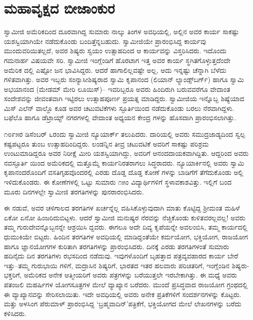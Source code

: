
\chapter{ಮಹಾವೃಕ್ಷದ ಬೀಜಾಂಕುರ}

\noindent

ಸ್ವಾಮೀಜಿ ಅಮೆರಿಕದಿಂದ ದೂರವಾಗಿದ್ದ ಸುಮಾರು ನಾಲ್ಕು ತಿಂಗಳ ಅವಧಿಯಲ್ಲಿ, ಅಲ್ಲಿನ ಅವರ ಕಾರ್ಯ ಸಾಕಷ್ಟು ಯಶಸ್ವಿಯಾಗಿಯೇ ನಡೆದುಕೊಂಡು ಬಂದಿತ್ತೆನ್ನಬಹುದು. ಸ್ವಾಮೀಜಿಯೇ ಪ್ರಾರಂಭಿಸಿದ್ದ ಕಾರ್ಯವು ಮುಂದುವರಿಯಿತಲ್ಲದೆ, ಅವರ ಶಿಷ್ಯರು ಸ್ವಯಂ ಉತ್ಸಾಹದಿಂದ ಆ ಕಾರ್ಯವನ್ನು ವಿಸ್ತರಿಸಿದರು. ಇದೊಂದು ಗಮನಾರ್ಹ ವಿಷಯವೇ ಸರಿ. ಸ್ವಾಮೀಜಿ ಇಂಗ್ಲೆಂಡಿಗೆ ಹೊರಟಾಗ ಇತ್ತ ಅವರ ಕಾರ್ಯ ಸ್ಥಗಿತಗೊಳ್ಳುತ್ತದೆಂದೇ ಅಮೆರಿಕ ದಲ್ಲಿ ಎಷ್ಟೋ ಜನ ಭಾವಿಸಿದ್ದರು. ಆದರೆ ಹಾಗಾಲಿಲ್ಲವಷ್ಟೇ ಅಲ್ಲ, ಅದು ಇನ್ನಷ್ಟು ಚೆನ್ನಾಗಿ ಬೆಳೆದು ಗಳಿತವಾಗಿತ್ತು. ಅವರ ಇಬ್ಬರು ಸಂನ್ಯಾಸೀಶಿಷ್ಯರಾದ ಸ್ವಾಮಿ ಕೃಪಾನಂದ (ಲಿಯಾನ್ ಲ್ಯಾಂಡ್ಸ್​ಬರ್ಗ್​) ಹಾಗೂ ಸ್ವಾಮಿ ಅಭಯಾನಂದ (ಮೇಡಮ್ ಮೇರಿ ಲೂಯಿಸ್​)– ಇವರಿಬ್ಬರೂ ಅವರು ಹಿಂದಿರುಗಿ ಬರುವವರೆಗೂ ವೇದಾಂತ ಸಂದೇಶವನ್ನು ಜೀವಂತವಾಗಿ ಇಟ್ಟಿರಲು ಉತ್ಸಾಹಪೂರ್ಣ ಪ್ರಯತ್ನ ಮಾಡಿದ್ದರು. ಸ್ವಾಮೀಜಿಯ ಇನ್ನೊಬ್ಬ ಶಿಷ್ಯೆಯಾದ ಮಿಸ್ ಎಲೆನ್ ವಾಲ್ಡೊ ಕೂಡ ಅವರ ಚಟುವಟಿಕೆಗಳು ಸ್ಫೂರ್ತಿಯಿಂದ ನಡೆದುಕೊಂಡು ಬರಲು ನೆರವಾಗಿದ್ದಳು. ಬಫೆಲೊ ಹಾಗೂ ಡೆಟ್ರಾಯ್ಟ್ ನಗರಗಳಲ್ಲಿ ವೇದಾಂತ ಅಧ್ಯಯನ ಕೇಂದ್ರ ಗಳನ್ನು ಹೊಸದಾಗಿ ಪ್ರಾರಂಭಿಸಲಾಗಿತ್ತು.

೧೮೯೫ರ ಡಿಸೆಂಬರ್ ೬ರಂದು ಸ್ವಾಮೀಜಿ ನ್ಯೂಯಾರ್ಕ್ ತಲುಪಿದರು. ದಾರಿಯಲ್ಲಿ ಅವರು ಸಮುದ್ರಜಾಡ್ಯದಿಂದ ಸ್ವಲ್ಪ ಕಷ್ಟಪಟ್ಟರೂ ತುಂಬ ಉತ್ಸಾಹದಿಂದಿದ್ದರು. ಲಂಡನ್ನಿನ ತೀವ್ರ ಚಟುವಟಿಕೆ ಅವರಿಗೆ ಸಾಕಷ್ಟು ಪರಿಶ್ರಮ ಉಂಟುಮಾಡಿದ್ದರೂ ಅವರ ನಿರೀಕ್ಷೆ ಮೀರಿ ಯಶಸ್ವಿಯಾಗಿದ್ದು, ಅವರಿಗೆ ಆನಂದದಾಯಕವಾಗಿದ್ದಿತು. ಆದ್ದರಿಂದ ಅವರು ನವಸ್ಫೂರ್ತಿ ಯಿಂದ ಅಮೆರಿಕದಲ್ಲಿ ಮತ್ತೊಮ್ಮೆ ಕಾರ್ಯನಿರತರಾಗಲು ಸಿದ್ಧರಾದರು. ನ್ಯೂಯಾರ್ಕಿನಲ್ಲಿ ಅವರು ಸ್ವಾಮಿ ಕೃಪಾನಂದರೊಂದಿಗೆ ವಸತಿಗೃಹವೊಂದರಲ್ಲಿ ಎರಡು ದೊಡ್ಡ ದೊಡ್ಡ ಕೋಣೆ ಗಳನ್ನು ಬಾಡಿಗೆಗೆ ತೆಗೆದುಕೊಂಡು ಅಲ್ಲಿ ಇಳಿದುಕೊಂಡರು. ಈ ಕೋಣೆಗಳಲ್ಲಿ ಒಟ್ಟು ಸುಮಾರು ೧೫ಂ ವಿದ್ಯಾರ್ಥಿಗಳಿಗೆ ಸ್ಥಳಾವಕಾಶವಿತ್ತು. ಇಲ್ಲಿಗೆ ಬಂದ ಮೂರು ದಿನಗಳಲ್ಲೇ ಸ್ವಾಮೀಜಿ ತರಗತಿಗಳನ್ನು ಪುನರಾರಂಭಿಸಿದರು.

ಈ ನಡುವೆ, ಅವರ ಚಳಿಗಾಲದ ತರಗತಿಗಳ ಖರ್ಚನ್ನೆಲ್ಲ ವಹಿಸಿಕೊಳ್ಳುವುದಾಗಿ ಮಾತು ಕೊಟ್ಟಿದ್ದ ಶ್ರೀಮಂತ ಮಹಿಳೆ ಏಕೋ ಏನೋ ಹಿಂಜರಿದುಬಿಟ್ಟಳು. ಆದರೆ ಸ್ವಾಮೀಜಿ ಮನುಷ್ಯರ ನೆರವನ್ನು ನೆಚ್ಚಿಕೊಂಡು ಕುಳಿತವರಲ್ಲವಲ್ಲ! ಅವರು ತಮ್ಮ ಗುರುದೇವನ್ನೊಬ್ಬನನ್ನೇ ಆಶ್ರಯಿಸಿ ದ್ದವರು. ಈಗಲೂ ಅದೇ ದಿವ್ಯ ಕೃಪೆಯನ್ನೇ ಅವಲಂಬಿಸಿ, ತಮ್ಮ ಕಾರ್ಯದಲ್ಲಿ ಧುಮುಕಿಯೇ ಬಿಟ್ಟರು. ಹಿಂದಿನ ತರಗತಿಗಳ ಅವಧಿಯಲ್ಲಿ ಮಾಡಿದ್ದಂತೆಯೇ ಕರ್ಮಯೋಗ, ಭಕ್ತಿಯೋಗ, ರಾಜಯೋಗ ಹಾಗೂ ಜ್ಞಾನಯೋಗಗಳ ಕುರಿತಾಗಿ ತರಗತಿಗಳನ್ನು ಪ್ರಾರಂಭಿಸಿದರು. ದಿನಕ್ಕೆ ಎರಡು ತರಗತಿಗಳಂತೆ ಸುಮಾರು ಹದಿನೈದು ದಿನ ತರಗತಿಗಳು ರಭಸದಿಂದ ನಡೆದುವು. ಇವುಗಳೊಂದಿಗೆ ಬೃಹತ್ತಾದ ಪತ್ರವ್ಯವಹಾರದ ಕಾರ್ಯ ಬೇರೆ ಇತ್ತು–ತಮ್ಮ ಗುರುಭಾಯಿ ಗಳಿಗೆ, ಮದ್ರಾಸಿನ ಶಿಷ್ಯರಿಗೆ, ಭಾರತದ ಇತರ ಹಲವಾರು ಪರಿಚಿತರಿಗೆ, ಇಂಗ್ಲೆಂಡಿನ ಶಿಷ್ಯರು- ಭಕ್ತರಿಗೆ, ಅಮೆರಿಕದ ಅನೇಕ ಆತ್ಮೀಯರಿಗೆ ಅವರು ಪತ್ರಗಳನ್ನು ಬರೆಯುತ್ತಲೇ ಇರಬೇಕಾಗಿತ್ತು. ಈ ಮಧ್ಯೆ ಅವರು ಪತಂಜಲಿ ಮಹರ್ಷಿಗಳ ಯೋಗಸೂತ್ರಗಳ ಮೇಲೆ ವ್ಯಾಖ್ಯಾನ ಬರೆದರು. ಮುಂದೆ ಪ್ರಸಿದ್ಧವಾದ ರಾಜಯೋಗ ಗ್ರಂಥದಲ್ಲಿ ಈ ವ್ಯಾಖ್ಯಾನವನ್ನು ಸೇರಿಸಲಾಯಿತು. ಇದೇ ಅವಧಿಯಲ್ಲಿ ಅವರು ಅನೇಕ ಪ್ರತಿಕೆಗಳಿಗೆ ಸಂದರ್ಶನಗಳನ್ನು ಕೊಟ್ಟರು. ಮತ್ತು ಅಳಸಿಂಗ ಪೆರುಮಾಳ್ ಪ್ರಾರಂಭಿಸಿದ್ದ ‘ಬ್ರಹ್ಮವಾದಿನ್​’ಪತ್ರಿಕೆಗೆ, ಭಕ್ತಿಯೋಗದ ಮೇಲೆ ಲೇಖನಗಳನ್ನು ಬರೆದು ಕಳಿಸಿದರು.

